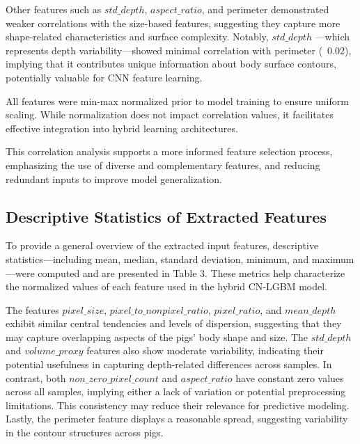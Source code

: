 Other features such as $std\_depth$, $aspect\_ratio$, and perimeter demonstrated weaker correlations with the size-based features, suggesting they capture more shape-related characteristics and surface complexity. Notably, $std\_depth$ —which represents depth variability—showed minimal correlation with perimeter (~0.02), implying that it contributes unique information about body surface contours, potentially valuable for CNN feature learning.

All features were min-max normalized prior to model training to ensure uniform scaling. While normalization does not impact correlation values, it facilitates effective integration into hybrid learning architectures.

This correlation analysis supports a more informed feature selection process, emphasizing the use of diverse and complementary features, and reducing redundant inputs to improve model generalization.

\subsection{Descriptive Statistics of Extracted Features}

To provide a general overview of the extracted input features, descriptive statistics—including mean, median, standard deviation, minimum, and maximum—were computed and are presented in Table 3. These metrics help characterize the normalized values of each feature used in the hybrid CN-LGBM model.

The features $pixel\_size$, $pixel\_to\_nonpixel\_ratio$, $pixel\_ratio$, and $mean\_depth$ exhibit similar central tendencies and levels of dispersion, suggesting that they may capture overlapping aspects of the pigs' body shape and size. The $std\_depth$ and $volume\_proxy$ features also show moderate variability, indicating their potential usefulness in capturing depth-related differences across samples. In contrast, both $non\_zero\_pixel\_count$ and $aspect\_ratio$ have constant zero values across all samples, implying either a lack of variation or potential preprocessing limitations. This consistency may reduce their relevance for predictive modeling. Lastly, the perimeter feature displays a reasonable spread, suggesting variability in the contour structures across pigs.

